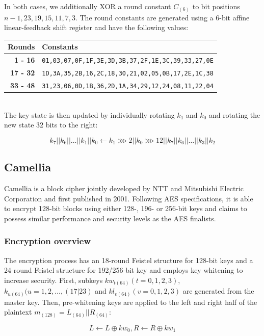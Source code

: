 In both cases, we additionally XOR a round constant $C_{(6)}$ to bit positions
$n-1,23,19,15,11,7,3$. The round constants are generated using a 6-bit affine
linear-feedback shift register and have the following values:\\

\begin{tabular}{r|l}
    \textbf{Rounds} & \textbf{Constants} \\
    \hline
    \textbf{1 - 16} &  \small\texttt{01,03,07,0F,1F,3E,3D,3B,37,2F,1E,3C,39,33,27,0E} \\
    \textbf{17 - 32} & \small\texttt{1D,3A,35,2B,16,2C,18,30,21,02,05,0B,17,2E,1C,38} \\
    \textbf{33 - 48} & \small\texttt{31,23,06,0D,1B,36,2D,1A,34,29,12,24,08,11,22,04}
\end{tabular}\\

The key state is then updated by individually rotating $k_1$ and $k_0$ and
rotating the new state $32$ bits to the right:

\[
    k_7||k_6||\dots||k_1||k_0\leftarrow k_1\ggg 2||k_0\ggg 12||k_7||k_6||\dots||k_3||k_2
\]

\subsection{Camellia}

Camellia\cite{camellia:2001} is a block cipher jointly developed by NTT and
Mitsubishi Electric Corporation and first published in 2001. Following AES
specifications, it is able to encrypt 128-bit blocks using either 128-, 196- or
256-bit keys and claims to possess similar performance and security levels as
the AES finalists.

\subsubsection{Encryption overview}

The encryption process has an 18-round Feistel structure for 128-bit keys and a
24-round Feistel structure for 192/256-bit key and employs key whitening to
increase security. First, subkeys $kw_{t(64)}(t=0,1,2,3)$,
$k_{u(64)}(u=1,2,\dots,(17|23)$ and $kl_{v(64)}(v=0,1,2,3)$ are generated from
the master key. Then, pre-whitening keys are applied to the left and right half
of the plaintext $m_{(128)}=L_{(64)}||R_{(64)}$:

\[
    L\leftarrow L\oplus kw_0, R\leftarrow R\oplus kw_1
\]

